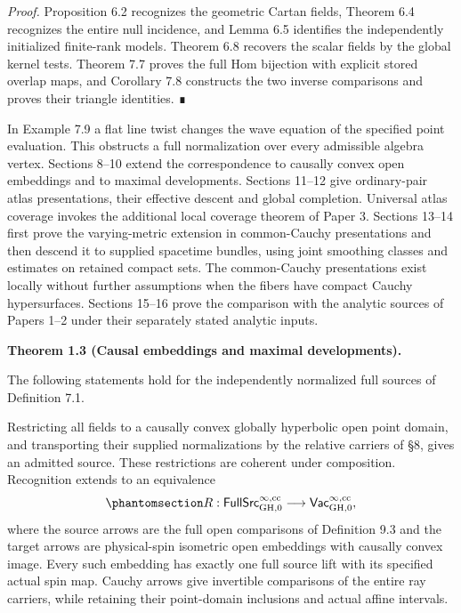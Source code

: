 \documentclass[
  english,
  11pt,
  reqno]{amsart}
\makeatletter
\newcommand{\pandocstatementheading}[1]{%
  \par\if@nobreak\else
    \addpenalty{\@beginparpenalty}%
    \addvspace{.5\baselineskip plus .2\baselineskip minus .2\baselineskip}%
  \fi
  {\normalfont\bfseries #1\par}%
  \nobreak\@afterindenttrue\@afterheading
}
\makeatother
\begin{document}
\emph{Proof.} Proposition 6.2 recognizes the geometric Cartan fields,
Theorem 6.4 recognizes the entire null incidence, and Lemma 6.5
identifies the independently initialized finite-rank models. Theorem 6.8
recovers the scalar fields by the global kernel tests. Theorem 7.7
proves the full Hom bijection with explicit stored overlap maps, and
Corollary 7.8 constructs the two inverse comparisons and proves their
triangle identities. ∎

In Example 7.9 a flat line twist changes the wave equation of the
specified point evaluation. This obstructs a full normalization over
every admissible algebra vertex. Sections 8--10 extend the
correspondence to causally convex open embeddings and to maximal
developments. Sections 11--12 give ordinary-pair atlas presentations,
their effective descent and global completion. Universal atlas coverage
invokes the additional local coverage theorem of Paper 3. Sections
13--14 first prove the varying-metric extension in common-Cauchy
presentations and then descend it to supplied spacetime bundles, using
joint smoothing classes and estimates on retained compact sets. The
common-Cauchy presentations exist locally without further assumptions
when the fibers have compact Cauchy hypersurfaces. Sections 15--16 prove
the comparison with the analytic sources of Papers 1--2 under their
separately stated analytic inputs.

\pandocstatementheading{\protect{}\label{thm:global-causal-development-overview}Theorem 1.3 (Causal embeddings and maximal developments).}

The following statements hold for the independently normalized full
sources of Definition 7.1.

Restricting all fields to a causally convex globally hyperbolic open
point domain, and transporting their supplied normalizations by the
relative carriers of §8, gives an admitted source. These restrictions
are coherent under composition. Recognition extends to an equivalence
\begin{equation}\protect\phantomsection\label{eq:global-causal-correspondence-overview}{
R:\mathsf{FullSrc}^{\infty,\mathrm{cc}}_{\mathrm{GH},0}
\longrightarrow
\mathsf{Vac}^{\infty,\mathrm{cc}}_{\mathrm{GH},0},
}\end{equation} where the source arrows are the full open comparisons of
Definition 9.3 and the target arrows are physical-spin isometric open
embeddings with causally convex image. Every such embedding has exactly
one full source lift with its specified actual spin map. Cauchy arrows
give invertible comparisons of the entire ray carriers, while retaining
their point-domain inclusions and actual affine intervals.
\end{document}
